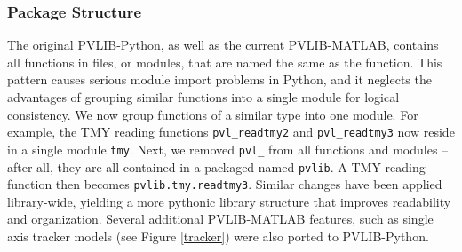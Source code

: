 \documentclass[conference]{IEEEtran}
\begin{document}
\subsubsection{Package Structure} 
The original PVLIB-Python, as well as the current PVLIB-MATLAB, contains all functions in files, or modules, that are named the same as the function. 
This pattern causes serious module import problems in Python, and it neglects the advantages of grouping similar functions into a single module for logical consistency.
We now group functions of a similar type into one module. 
For example, the TMY reading functions \texttt{pvl{\_}readtmy2} and \texttt{pvl{\_}readtmy3} now reside in a single module \texttt{tmy}.
Next, we removed \texttt{pvl{\_}} from all functions and modules -- after all, they are all contained in a packaged named \texttt{pvlib}. 
A TMY reading function then becomes \texttt{pvlib.tmy.readtmy3}. 
Similar changes have been applied library-wide, yielding a more pythonic library structure that improves readability and organization.
Several additional PVLIB-MATLAB features, such as single axis tracker models (see Figure \ref{tracker}) were also ported to PVLIB-Python.
\end{document}
